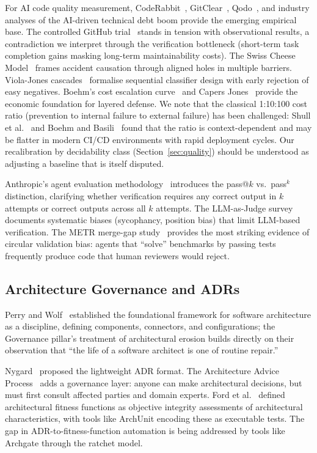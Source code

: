 \documentclass[11pt, a4paper]{googledeepmind}
\begin{document}
For AI code quality measurement, CodeRabbit~\citep{coderabbit2025}, GitClear~\citep{gitclear2025}, Qodo~\citep{qodo2025}, and industry analyses of the AI-driven technical debt boom provide the emerging empirical base. The controlled GitHub trial~\citep{github2024rct} stands in tension with observational results, a contradiction we interpret through the verification bottleneck (short-term task completion gains masking long-term maintainability costs). The Swiss Cheese Model~\citep{reason1990} frames accident causation through aligned holes in multiple barriers. Viola-Jones cascades~\citep{violajones2004} formalise sequential classifier design with early rejection of easy negatives. Boehm's cost escalation curve~\citep{boehm1981} and Capers Jones~\citep{capersjones2012} provide the economic foundation for layered defense. We note that the classical 1:10:100 cost ratio (prevention to internal failure to external failure) has been challenged: Shull et al.~\citep{shull2002} and Boehm and Basili~\citep{boehm2001} found that the ratio is context-dependent and may be flatter in modern CI/CD environments with rapid deployment cycles. Our recalibration by decidability class (Section~\ref{sec:quality}) should be understood as adjusting a baseline that is itself disputed.

Anthropic's agent evaluation methodology~\citep{anthropic2026evals} introduces the pass@$k$ vs.\ pass$^k$ distinction, clarifying whether verification requires any correct output in $k$ attempts or correct outputs across all $k$ attempts. The LLM-as-Judge survey~\citep{li2024survey} documents systematic biases (sycophancy, position bias) that limit LLM-based verification. The METR merge-gap study~\citep{metr2026swebench} provides the most striking evidence of circular validation bias: agents that ``solve'' benchmarks by passing tests frequently produce code that human reviewers would reject.


\subsection{Architecture Governance and ADRs}

Perry and Wolf~\citep{perry1992} established the foundational framework for software architecture as a discipline, defining components, connectors, and configurations; the Governance pillar's treatment of architectural erosion builds directly on their observation that ``the life of a software architect is one of routine repair.''

Nygard~\citep{nygard2011} proposed the lightweight ADR format. The Architecture Advice Process~\citep{harmellaw2023} adds a governance layer: anyone can make architectural decisions, but must first consult affected parties and domain experts. Ford et al.~\citep{ford2017} defined architectural fitness functions as objective integrity assessments of architectural characteristics, with tools like ArchUnit encoding these as executable tests. The gap in ADR-to-fitness-function automation is being addressed by tools like Archgate through the ratchet model.
\end{document}
